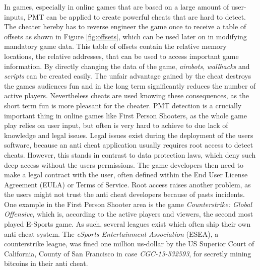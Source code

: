 
In games, especially in online games that are based on a large amount of user-inputs, PMT can be applied to create powerful cheats that are hard to detect. The cheater hereby has to reverse engineer the game once to receive a table of offsets as shown in Figure \ref{fig:offsets}, which can be used later on in modifying mandatory game data. This table of offsets contain the relative memory locations, the relative addresses, that can be used to access important game information. By directly changing the data of the game, \emph{aimbots}, \emph{wallhacks} and \emph{scripts} can be created easily. The unfair advantage gained by the cheat destroys the games audiences fun and in the long term significantly reduces the number of active players. Nevertheless cheats are used knowing these consequences, as the short term fun is more pleasant for the cheater. PMT detection is a crucially important thing in online games like First Person Shooters, as the whole game play relies on user input, but often is very hard to achieve to due lack of knowledge and legal issues. Legal issues exist during the deployment of the users software, because an anti cheat application usually requires root access to detect cheats. However, this stands in contrast to data protection laws, which deny such deep access without the users permissions. The game developers then need to make a legal contract with the user, often defined within the End User License Agreement (EULA) or Terms of Service. Root access raises another problem, as the users might not trust the anti cheat developers because of pasts incidents. One example in the First Person Shooter area is the game \emph{Counterstrike: Global Offensive}, which is, according to the active players and viewers, the second most played E-Sports game. As such, several leagues exist which often ship their own anti cheat system. The \emph{eSports Entertainment Association} (ESEA), a counterstrike league, was fined one million us-dollar by the US Superior Court of California, County of San Francisco \cite{esea} in case \emph{CGC-13-532593}, for secretly mining bitcoins in their anti cheat. 